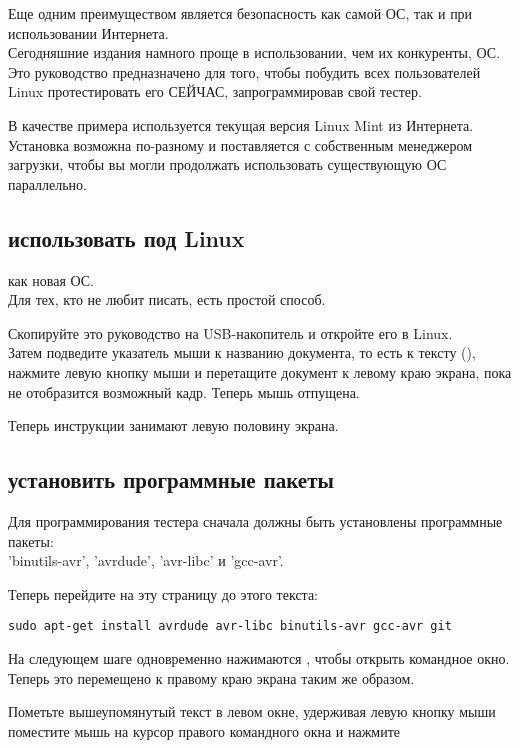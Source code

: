 Еще одним преимуществом является безопасность как самой ОС, так и при использовании Интернета. \\
Сегодняшние издания намного проще в использовании, чем их конкуренты, ОС. \\
Это руководство предназначено для того, чтобы побудить всех  пользователей Linux протестировать его СЕЙЧАС, запрограммировав свой тестер.

В качестве примера используется текущая версия Linux Mint из Интернета.
\\ Установка возможна по-разному и поставляется с собственным менеджером загрузки, чтобы вы могли продолжать использовать существующую ОС параллельно.
\subsection{использовать под Linux}
как новая ОС. \\
Для тех, кто не любит писать, есть простой способ.

Скопируйте это руководство на USB-накопитель и откройте его в Linux. \\
Затем подведите указатель мыши к названию документа, то есть к тексту (),
нажмите левую кнопку мыши и перетащите документ к левому краю экрана, пока не отобразится возможный кадр.
Теперь мышь отпущена.

Теперь инструкции занимают левую половину экрана.
\subsection{установить программные пакеты}
Для программирования тестера сначала должны быть установлены программные пакеты: \\
'binutils-avr', 'avrdude', 'avr-libc' и 'gcc-avr'.

Теперь перейдите на эту страницу до этого текста:

\begin{large} \vspace{-0.4em} \begin{verbatim}
sudo apt-get install avrdude avr-libc binutils-avr gcc-avr git
\end{verbatim} \end{large}
На следующем шаге одновременно нажимаются , чтобы открыть командное окно.
Теперь это перемещено к правому краю экрана таким же образом.

Пометьте вышеупомянутый текст в левом окне, удерживая левую кнопку мыши
\\ поместите мышь на курсор правого командного окна и нажмите

